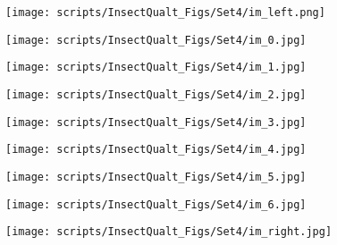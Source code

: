 \documentclass[10pt,twocolumn,letterpaper]{article}
\begin{document}
\begin{table*}[!t]
\begin{figure*}[t]
\begin{center}
    \begin{subfigure}[b]{0.1\textwidth}
        \centering
        \texttt{[image: scripts/InsectQualt\_Figs/Set4/im\_left.png]}
    \end{subfigure}
    \hfill
    \begin{subfigure}[b]{0.1\textwidth}
        \centering
        \texttt{[image: scripts/InsectQualt\_Figs/Set4/im\_0.jpg]}
    \end{subfigure}
    \hfill
    \begin{subfigure}[b]{0.1\textwidth}
        \centering
        \texttt{[image: scripts/InsectQualt\_Figs/Set4/im\_1.jpg]}
    \end{subfigure}
    \hfill
    \begin{subfigure}[b]{0.1\textwidth}
        \centering
        \texttt{[image: scripts/InsectQualt\_Figs/Set4/im\_2.jpg]}
    \end{subfigure}
    \hfill
    \begin{subfigure}[b]{0.1\textwidth}
        \centering
        \texttt{[image: scripts/InsectQualt\_Figs/Set4/im\_3.jpg]}
    \end{subfigure}
    \hfill
    \begin{subfigure}[b]{0.1\textwidth}
        \centering
        \texttt{[image: scripts/InsectQualt\_Figs/Set4/im\_4.jpg]}
    \end{subfigure}
    \hfill
    \begin{subfigure}[b]{0.1\textwidth}
        \centering
        \texttt{[image: scripts/InsectQualt\_Figs/Set4/im\_5.jpg]}
    \end{subfigure}
    \hfill
    \begin{subfigure}[b]{0.1\textwidth}
        \centering
        \texttt{[image: scripts/InsectQualt\_Figs/Set4/im\_6.jpg]}
    \end{subfigure}
    \hfill
    \begin{subfigure}[b]{0.1\textwidth}
        \centering
        \texttt{[image: scripts/InsectQualt\_Figs/Set4/im\_right.jpg]}
    \end{subfigure}
    



\end{center}
\end{figure*}
\end{table*}
\end{document}
